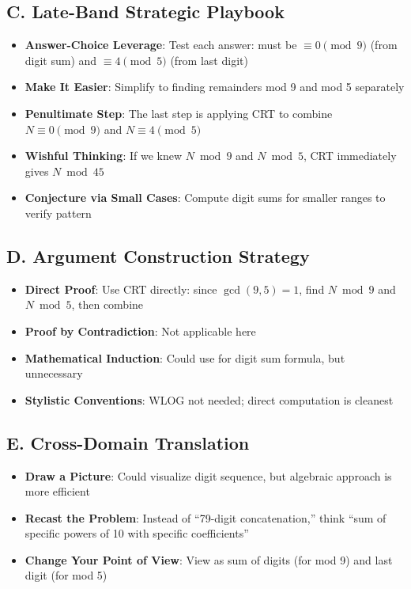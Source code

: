 \documentclass[11pt]{article}
\begin{document}
\begin{strategicbox}
\subsection*{C. Late-Band Strategic Playbook}
\begin{itemize}[leftmargin=*]
    \item \textbf{Answer-Choice Leverage}: Test each answer: must be $\equiv 0 \pmod{9}$ (from digit sum) and $\equiv 4 \pmod{5}$ (from last digit)
    
    \item \textbf{Make It Easier}: Simplify to finding remainders mod 9 and mod 5 separately
    
    \item \textbf{Penultimate Step}: The last step is applying CRT to combine $N \equiv 0 \pmod{9}$ and $N \equiv 4 \pmod{5}$
    
    \item \textbf{Wishful Thinking}: If we knew $N \bmod 9$ and $N \bmod 5$, CRT immediately gives $N \bmod 45$
    
    \item \textbf{Conjecture via Small Cases}: Compute digit sums for smaller ranges to verify pattern
\end{itemize}

\subsection*{D. Argument Construction Strategy}
\begin{itemize}[leftmargin=*]
    \item \textbf{Direct Proof}: Use CRT directly: since $\gcd(9,5)=1$, find $N \bmod 9$ and $N \bmod 5$, then combine
    
    \item \textbf{Proof by Contradiction}: Not applicable here
    
    \item \textbf{Mathematical Induction}: Could use for digit sum formula, but unnecessary
    
    \item \textbf{Stylistic Conventions}: WLOG not needed; direct computation is cleanest
\end{itemize}

\subsection*{E. Cross-Domain Translation}
\begin{itemize}[leftmargin=*]
    \item \textbf{Draw a Picture}: Could visualize digit sequence, but algebraic approach is more efficient
    
    \item \textbf{Recast the Problem}: Instead of ``79-digit concatenation,'' think ``sum of specific powers of 10 with specific coefficients''
    
    \item \textbf{Change Your Point of View}: View as sum of digits (for mod 9) and last digit (for mod 5)
\end{itemize}
\end{strategicbox}
\end{document}

